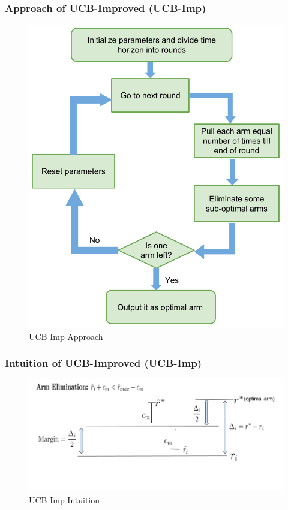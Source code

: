 \begin{frame}
\frametitle{Approach of UCB-Improved (UCB-Imp)}
\begin{figure}
\caption{UCB Imp Approach}
\includegraphics[scale=0.178]{img/Ucb-Imp.png}
\end{figure}
\end{frame}



\begin{frame}
\frametitle{Intuition of UCB-Improved (UCB-Imp)}
\begin{figure}
\caption{UCB Imp Intuition}
\includegraphics[scale=0.278]{img/Ucb_Imp_intuition.png}
\end{figure}
\end{frame}


